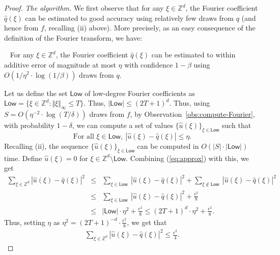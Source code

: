 \begin{proof}
\emph{The algorithm.}
We first observe that for any $\xi \in \mathbb{Z}^d$, the Fourier coefficient $\widehat{q}(\xi)$ can be 
estimated
to good accuracy using relatively few draws from $q$ (and hence from $f$, recalling (ii) above).  More precisely, as an easy consequence of the definition of the Fourier transform, we have:
\begin{observation}~\label{obs:compute-Fourier}
For any $\xi \in \mathbb{Z}^d$, the Fourier coefficient $\widehat{q}(\xi)$ can be 
estimated
to 
within
additive error 
of magnitude at most $\eta$
with confidence $1-\beta$ using $O(1/\eta^2 \cdot \log(1/\beta))$ draws from $q$. 
\end{observation}
Let us define the set $\mathsf{Low}$ of low-degree Fourier coefficients as $\mathsf{Low} = \{\xi \in \mathbb{Z}^d : \Vert \xi \Vert_\infty \le T\}$. 
Thus, $|\mathsf{Low}| \le (2T+1)^d$.  Thus, using $S = O(\eta^{-2} \cdot \log (T/ \delta))$ draws from $f$, by Observation~\ref{obs:compute-Fourier}, with probability $1-\delta$, we can compute
a set of values $\{\widehat{u}(\xi)\}_{\xi \in \mathsf{Low}}$ such that 
\begin{equation}\label{eq:approx}
\textrm{For all }\xi \in \mathsf{Low}, \ |\widehat{u}(\xi) - \widehat{q}(\xi)| \le \eta. 
\end{equation}
Recalling (ii), 
the sequence $\{\widehat{u}(\xi)\}_{\xi \in \mathsf{Low}}$ 
can be computed in $O(|S| \cdot |\mathsf{Low}|)$ time. 
Define $\widehat{u}(\xi) =0$ for $\xi \in \mathbb{Z}^d \setminus \mathsf{Low}$. Combining (\ref{eq:approx}) with this, we get 
\begin{eqnarray}
\sum_{\xi \in \mathbb{Z}^d}  |\widehat{u}(\xi) - \widehat{q}(\xi)|^2 &\le& \sum_{\xi \in \mathsf{Low}} \ |\widehat{u}(\xi) - \widehat{q}(\xi)|^2 + \sum_{\xi \not \in \mathsf{Low}} \ |\widehat{u}(\xi) - \widehat{q}(\xi)|^2  \nonumber \\&\le& \sum_{\xi \in \mathsf{Low}} \ |\widehat{u}(\xi) - \widehat{q}(\xi)|^2 + \frac{\epsilon^2 }{8} \nonumber \\
&\le& | \mathsf{Low}| \cdot \eta^2 +  \frac{\epsilon^2}{8}  \le (2T+1)^d \cdot \eta^2 + \frac{\epsilon^2 }{8}. \nonumber 
\end{eqnarray}
Thus, setting $\eta$ as $\eta^2 = (2T+1)^{-d} \cdot \frac{\epsilon^2}{8} $, we get that \begin{eqnarray}\sum_{\xi \in \mathbb{Z}^d}  |\widehat{u}(\xi) - \widehat{q}(\xi)|^2 \le \frac{\epsilon^2}{4}. \label{eq:eta-bound} \end{eqnarray}

\end{proof}
